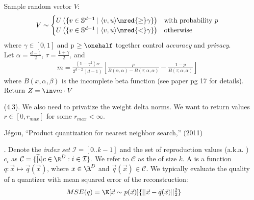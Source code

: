 \documentclass[11pt]{article}
\begin{document}
\begin{algorithm}
	Sample random vector $V$:
	\begin{align}
		V \sim \begin{cases}
			U\left( 
				\{  v \in \mathbb{S}^{d-1} \mid \langle v, u \rangle \mred{ \geq } \gamma  \} 
				\right) & \text{with probability } p \\
						U\left( 
			\{  v \in \mathbb{S}^{d-1} \mid \langle v, u \rangle \mred{ < } \gamma  \}
			\right) & \text{otherwise}
		\end{cases}
	\end{align}
	where $\gamma \in [0, 1]$ and p $\geq \onehalf$ together control \textit{accuracy}  and \textit{privacy}.\\ 
	
	Let $\alpha = \tfrac{d-1}{2}$, $\tau = \tfrac{1+\gamma}{2}$, and
	\begin{align}
		m = \frac{  (1-\gamma^2)\alpha  }{  2^{d-2} (d-1)  } \left[
			\frac{p}{B(\alpha, \alpha) - B(\tau; \alpha, \alpha)}
			- \frac{1 - p}{B(\tau; \alpha, \alpha)}
		\right]
	\end{align}
	where $B(x, \alpha, \beta)$ is the incomplete beta function (see paper pg 17 for details). \\
	
	Return $Z = \inv m \cdot V$
\end{algorithm}


 (4.3). We also need to privatize the weight delta norms. We want to return values $r \in [0, r_{max}]$ for some $r_{max} < \infty$. 






\vspace{-1em}
{\footnotesize J\'{e}gou, ``Product quantization for nearest neighbor search,'' (2011)}


. Denote the \textit{index set} $\mathcal I = [0..k-1]$ and the set of reproduction values (a.k.a. ) $c_i$ as $\mathcal C = \{ \vec[i]{c} \in \R^D : i \in \mathcal I \}$. We refer to $\mathcal C$ as the  of size $k$.  A  is a function $q: \vec x \mapsto \vec q(\vec x)$, where $x \in \R^D$ and $\vec q(\vec x) \in \mathcal C$. We typically evaluate the quality of a quantizer with mean squared error of the reconstruction:
\begin{align}
	MSE(q) &= \E[\vec x \sim p(\vec x)]{|| \vec x - \vec q (\vec x) ||_2^2 }
\end{align}
\vspace{1em}
\end{document}
